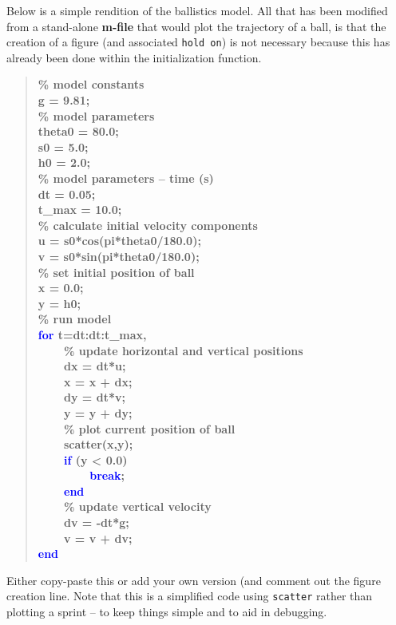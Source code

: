 \documentclass{tufte-book} %
\newenvironment{docspecbold}{\begin{quotation}\ttfamily\bfseries\parskip0pt\parindent0pt\ignorespaces}{\end{quotation}}
\begin{document}
Below is a simple rendition of the ballistics model. All that has been modified from a stand-alone \textbf{m-file} that would plot the trajectory of a ball, is that the creation of a figure (and associated \texttt{hold on}) is not necessary because this has already been done within the initialization function. 
\begin{docspecbold}
\textcolor[rgb]{0,0.501961,0}{\% model constants}
\\g = 9.81;
\\\textcolor[rgb]{0,0.501961,0}{\% model parameters}
\\theta0 = 80.0;
\\s0 = 5.0;
\\h0 = 2.0;
\\\textcolor[rgb]{0,0.501961,0}{\% model parameters -- time (s)}
\\dt = 0.05;
\\t\_max = 10.0;
\\\textcolor[rgb]{0,0.501961,0}{\% calculate initial velocity components}
\\u = s0*cos(pi*theta0/180.0);
\\v = s0*sin(pi*theta0/180.0);
\\\textcolor[rgb]{0,0.501961,0}{\% set initial position of ball}
\\x = 0.0;
\\y = h0;
\\\textcolor[rgb]{0,0.501961,0}{\% run model}
\\\textcolor{blue}{for} t=dt:dt:t\_max,
\\ \ \ \ \    \textcolor[rgb]{0,0.501961,0}{\% update horizontal and vertical positions}
\\ \ \ \ \    dx = dt*u;
\\ \ \ \ \    x = x + dx;
\\ \ \ \ \    dy = dt*v;
\\ \ \ \ \    y = y + dy;
\\ \ \ \ \    \textcolor[rgb]{0,0.501961,0}{\% plot current position of ball}
\\ \ \ \ \    scatter(x,y);
\\ \ \ \ \    \textcolor{blue}{if} (y < 0.0)
\\ \ \ \ \ \ \ \ \        \textcolor{blue}{break};
\\ \ \ \ \    \textcolor{blue}{end}
\\ \ \ \ \    \textcolor[rgb]{0,0.501961,0}{\% update vertical velocity}
\\ \ \ \ \   dv = -dt*g;
\\ \ \ \ \   v = v + dv;
\\\textcolor{blue}{end}
\end{docspecbold}
Either copy-paste this or add your own version (and comment out the figure creation line. Note that this is a simplified code using \texttt{scatter} rather than plotting a sprint -- to keep things simple  and to aid in debugging.
\end{document}
